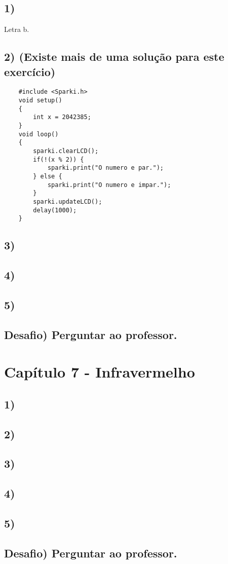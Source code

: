     \subsection*{1)} Letra b.
    
    \subsection*{2) (Existe mais de uma solução para este exercício)}
    
    \begin{verbatim}
    #include <Sparki.h>
    void setup()
    {
        int x = 2042385;
    }
    void loop()
    {
        sparki.clearLCD();
        if(!(x % 2)) {
            sparki.print("O numero e par.");
        } else {
            sparki.print("O numero e impar.");
        }
        sparki.updateLCD();
        delay(1000);
    }
    \end{verbatim}
    
    \subsection*{3)}
    
    \subsection*{4)}
    
    \subsection*{5)}
    
    \subsection*{Desafio) Perguntar ao professor.}

\section*{Capítulo 7 - Infravermelho}

    \subsection*{1)}
    
    \subsection*{2)}
    
    \subsection*{3)}
    
    \subsection*{4)}
    
    \subsection*{5)}
    
    \subsection*{Desafio) Perguntar ao professor.}